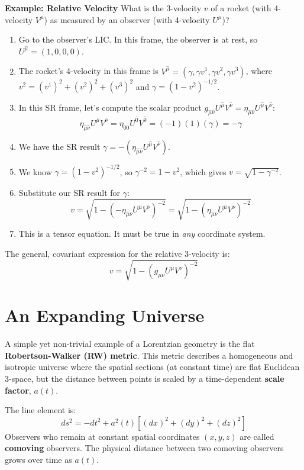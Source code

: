 \documentclass[11pt, a4paper]{report}
\begin{document}
\textbf{Example: Relative Velocity}
What is the 3-velocity $v$ of a rocket (with 4-velocity $V^\mu$) as measured by an observer (with 4-velocity $U^\mu$)?
\begin{enumerate}
    \item Go to the observer's LIC. In this frame, the observer is at rest, so $U^{\hat{\mu}} = (1, 0, 0, 0)$.
    \item The rocket's 4-velocity in this frame is $V^{\hat{\mu}} = (\gamma, \gamma v^1, \gamma v^2, \gamma v^3)$, where $v^2 = (v^1)^2 + (v^2)^2 + (v^3)^2$ and $\gamma = (1-v^2)^{-1/2}$.
    \item In this SR frame, let's compute the scalar product $g_{\hat{\mu}\hat{\nu}} U^{\hat{\mu}} V^{\hat{\nu}} = \eta_{\hat{\mu}\hat{\nu}} U^{\hat{\mu}} V^{\hat{\nu}}$:
    \[
        \eta_{\hat{\mu}\hat{\nu}} U^{\hat{\mu}} V^{\hat{\nu}} = \eta_{00} U^{\hat{0}} V^{\hat{0}} = (-1)(1)(\gamma) = -\gamma
    \]
    \item We have the SR result $\gamma = - ( \eta_{\hat{\mu}\hat{\nu}} U^{\hat{\mu}} V^{\hat{\nu}} )$.
    \item We know $\gamma = (1-v^2)^{-1/2}$, so $\gamma^{-2} = 1-v^2$, which gives $v = \sqrt{1 - \gamma^{-2}}$.
    \item Substitute our SR result for $\gamma$:
    \[
        v = \sqrt{1 - ( - \eta_{\hat{\mu}\hat{\nu}} U^{\hat{\mu}} V^{\hat{\nu}} )^{-2}} = \sqrt{1 - ( \eta_{\hat{\mu}\hat{\nu}} U^{\hat{\mu}} V^{\hat{\nu}} )^{-2}}
    \]
    \item This is a tensor equation. It must be true in \emph{any} coordinate system.
\end{enumerate}
The general, covariant expression for the relative 3-velocity is:
\begin{equation}
    v = \sqrt{1 - (g_{\mu\nu} U^\mu V^\nu)^{-2}}
\end{equation}
\section{An Expanding Universe}

A simple yet non-trivial example of a Lorentzian geometry is the flat \textbf{Robertson-Walker (RW) metric}. This metric describes a homogeneous and isotropic universe where the spatial sections (at constant time) are flat Euclidean 3-space, but the distance between points is scaled by a time-dependent \textbf{scale factor}, $a(t)$.

The line element is:
\begin{equation}\label{eq:rw-metric}
    ds^2 = -dt^2 + a^2(t)[(dx)^2 + (dy)^2 + (dz)^2]
\end{equation}
Observers who remain at constant spatial coordinates $(x, y, z)$ are called \textbf{comoving} observers. The physical distance between two comoving observers grows over time as $a(t)$.
\end{document}
